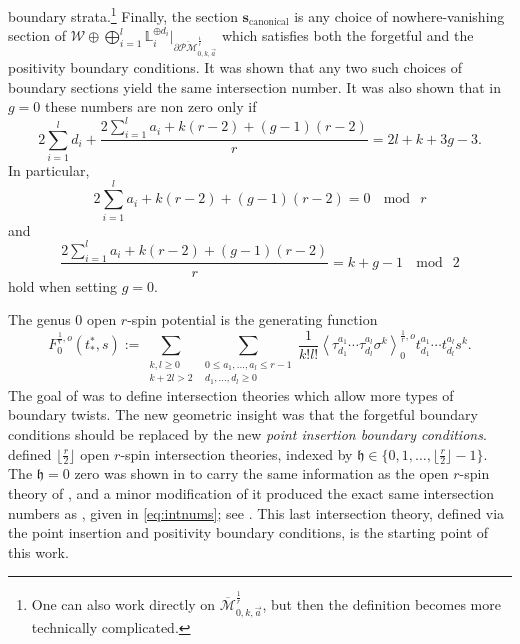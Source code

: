 \documentclass[11pt]{amsart}
\theoremstyle{definition}
\theoremstyle{remark}
\newcommand{\Mbarr}{{{\overline{\mathcal{M}}}^{\frac{1}{r}}_{0,k,\vec{a}}}}
\newcommand{\oPMr}{{{\overline{\mathcal{PM}}}^{\frac{1}{r}}_{0,k,\vec{a}}}}
\newcommand{\<}{\left<}
\renewcommand{\>}{\right>}
\numberwithin{equation}{section}
\begin{document}
boundary strata.\footnote{One can also work directly on $\Mbarr$, but then the definition becomes more technically complicated.} Finally, %
the section $\mathbf{s}_{\text{canonical}}$ is any choice of nowhere-vanishing section of $\mathcal{W} \oplus \bigoplus_{i=1}^l\mathbb{L}_i^{\oplus d_i}|_{\partial\oPMr}$ which satisfies both %
the forgetful and %
the positivity boundary conditions.  It was shown that any two such choices of boundary sections yield the same intersection number.
It was also shown that in $g=0$ these numbers are non zero only if
\begin{equation}\label{eq:dim_equal_rk}
2\sum_{i=1}^l d_i +\frac{2\sum_{i=1}^la_i+k(r-2)+(g-1)(r-2)}{r}=2l+k+3g-3.
\end{equation}
In %
particular, 
\begin{equation}\label{eq:mod_r_general_g}
{2\sum_{i=1}^la_i+k(r-2)+(g-1)(r-2)}=0~\mod~r
\end{equation}
and %
\begin{equation}\label{eq:mod_2_general_g}
\frac{2\sum_{i=1}^la_i+k(r-2)+(g-1)(r-2)}{r} = k+g-1~\mod~2
\end{equation}
hold when setting $g=0.$ 


The genus $0$ open $r$-spin potential is the generating function
\[
F^{\frac{1}{r},o}_0(t^*_*,s):=\sum_{\substack{k,l\geq 0\\k+2l>2}} \sum_{\substack{0 \leq a_1, \ldots, a_l \leq r-1\\ d_1, \ldots, d_l \geq 0}} \frac{1}{k!l!}\<\tau^{a_1}_{d_1}\cdots\tau^{a_l}_{d_l}\sigma^k\>^{\frac{1}{r},o}_0 t^{a_1}_{d_1} \cdots t^{a_l}_{d_l}s^k.
\]
The goal of \cite{TZ1,TZ2} was to define intersection theories which allow more types of boundary twists.
The new geometric insight was that the forgetful boundary conditions should be replaced by the new \emph{point insertion boundary conditions}.
\cite{TZ2} defined $\lfloor\frac{r}{2}\rfloor$ open $r$-spin intersection theories, indexed by $\mathfrak{h}\in\{0,1,\ldots,\lfloor\frac{r}{2}\rfloor-1\}.$ The $\mathfrak{h}=0$ zero was shown in \cite[\S 5]{TZ2} to carry the same information as the open $r$-spin theory of \cite{BCT2}, and a minor modification of it produced the exact same intersection numbers as \cite{BCT2}, given %
in \eqref{eq:intnums}; see %
\cite[Remark 5.7]{TZ2}.
This last intersection theory, defined via the point insertion and positivity boundary conditions, is the starting point of this work.   
\end{document}
